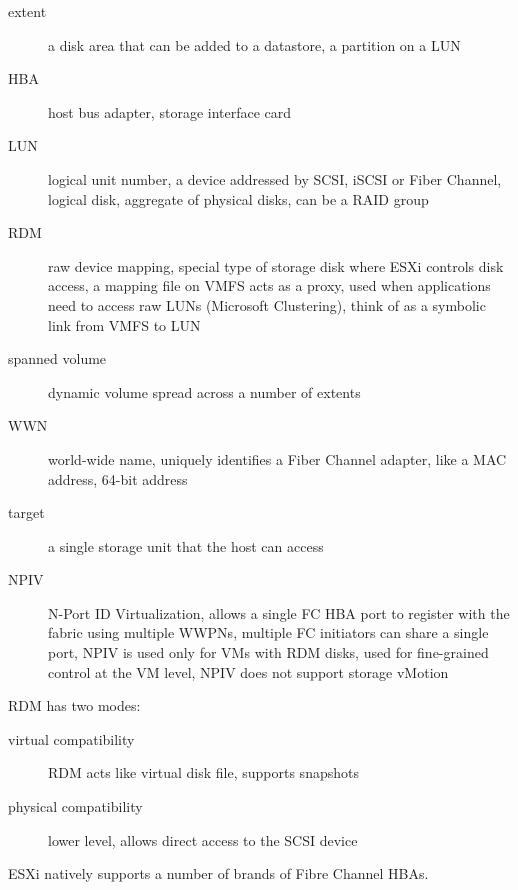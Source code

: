 \begin{description}

  \item[extent] a disk area that can be added to a datastore, a partition on
    a LUN

  \item[HBA] host bus adapter, storage interface card

  \item [LUN] logical unit number, a device addressed by SCSI, iSCSI or Fiber
    Channel, logical disk, aggregate of physical disks, can be a RAID group

  \item[RDM] raw device mapping, special type of storage disk where ESXi
    controls disk access, a mapping file on VMFS acts as a proxy, used when
    applications need to access raw LUNs (Microsoft Clustering), think of
    as a symbolic link from VMFS to LUN

  \item[spanned volume]
    dynamic volume spread across a number of extents

  \item[WWN] world-wide name, uniquely identifies a Fiber Channel adapter,
    like a MAC address, 64-bit address

  \item[target] a single storage unit that the host can access

  \item[NPIV]
    N-Port ID Virtualization, allows a single FC HBA port to register with the
    fabric using multiple WWPNs, multiple FC initiators can share a single port,
    NPIV is used only for VMs with RDM disks, used for fine-grained control
    at the VM level, NPIV does not support storage vMotion

\end{description}

RDM has two modes:

\begin{description}

\item[virtual compatibility]
RDM acts like virtual disk file, supports snapshots

\item[physical compatibility]
lower level, allows direct access to the SCSI device

\end{description}

ESXi natively supports a number of brands of Fibre Channel HBAs.

